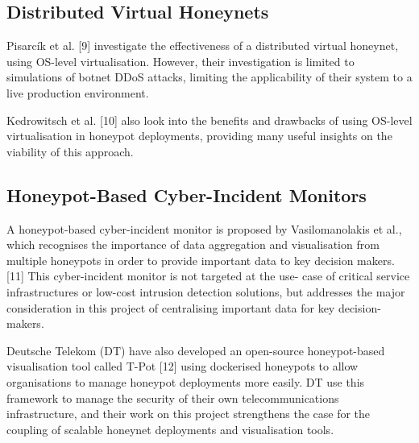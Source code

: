 \subsection{Distributed Virtual Honeynets}

Pisarcík et al. [9] investigate the effectiveness of a distributed virtual honeynet, using OS-level virtualisation. However, their investigation is limited to simulations of botnet DDoS attacks, limiting the applicability of their system to a live production environment. 

Kedrowitsch et al. [10] also look into the benefits and drawbacks of using OS-level virtualisation in honeypot deployments, providing many useful insights on the viability of this approach. 

\subsection{Honeypot-Based Cyber-Incident Monitors}

A honeypot-based cyber-incident monitor is proposed by Vasilomanolakis et al., which recognises the importance of data aggregation and visualisation from multiple honeypots in order to provide important data to key decision makers. [11] This cyber-incident monitor is not targeted at the use- case of critical service infrastructures or low-cost intrusion detection solutions, but addresses the major consideration in this project of centralising important data for key decision-makers. 

Deutsche Telekom (DT) have also developed an open-source honeypot-based visualisation tool called T-Pot [12] using dockerised honeypots to allow organisations to manage honeypot deployments more easily. DT use this framework to manage the security of their own telecommunications infrastructure, and their work on this project strengthens the case for the coupling of scalable honeynet deployments and visualisation tools.  


